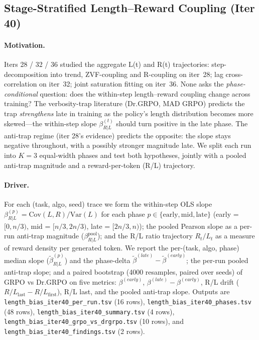 \subsection{Stage-Stratified Length--Reward Coupling (Iter 40)}
\label{sec:length-bias-iter40}

\paragraph{Motivation.}
Iters 28 / 32 / 36 studied the aggregate L(t) and R(t) trajectories:
step-decomposition into trend, ZVF-coupling and R-coupling on
iter~28; lag cross-correlation on iter~32; joint saturation fitting
on iter~36.  None asks the \emph{phase-conditional} question: does
the within-step length--reward coupling change across training?  The
verbosity-trap literature (Dr.GRPO, MAD GRPO) predicts the trap
\emph{strengthens} late in training as the policy's length
distribution becomes more skewed---the within-step slope
$\beta_{R|L}^{(t)}$ should turn positive in the late phase.  The
anti-trap regime (iter 28's evidence) predicts the opposite: the
slope stays negative throughout, with a possibly stronger magnitude
late.  We split each run into $K=3$ equal-width phases and test both
hypotheses, jointly with a pooled anti-trap magnitude and a
reward-per-token (R/L) trajectory.

\paragraph{Driver.}
For each (task, algo, seed) trace we form the within-step OLS slope
$\beta_{R|L}^{(p)} = \mathrm{Cov}(L,R)/\mathrm{Var}(L)$ for each phase
$p \in \{\mathrm{early},\mathrm{mid},\mathrm{late}\}$ (early =
$[0, n/3)$, mid = $[n/3, 2n/3)$, late = $[2n/3, n)$); the pooled
Pearson slope as a per-run anti-trap magnitude
($\beta_{R|L}^{\mathrm{pool}}$); and the R/L ratio trajectory
$R_t / L_t$ as a measure of reward density per generated token.  We
report the per-(task, algo, phase) median slope
($\tilde\beta_{R|L}^{(p)}$) and the phase-delta
$\tilde\beta^{(late)} - \tilde\beta^{(early)}$; the per-run pooled
anti-trap slope; and a paired bootstrap (4000 resamples, paired over
seeds) of GRPO vs Dr.GRPO on five metrics:
$\beta^{(early)}$, $\beta^{(late)}-\beta^{(early)}$, R/L drift
($R/L_{\mathrm{last}} - R/L_{\mathrm{first}}$), R/L last, and the
pooled anti-trap slope.  Outputs are
\texttt{length\_bias\_iter40\_per\_run.tsv} (16 rows),
\texttt{length\_bias\_iter40\_phases.tsv} (48 rows),
\texttt{length\_bias\_iter40\_summary.tsv} (4 rows),
\texttt{length\_bias\_iter40\_grpo\_vs\_drgrpo.tsv} (10 rows), and
\texttt{length\_bias\_iter40\_findings.tsv} (2 rows).

